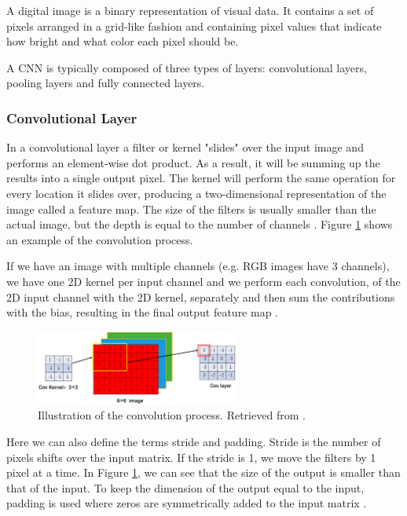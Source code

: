 A digital image is a binary representation of visual data. It contains a set of pixels arranged in a grid-like fashion and containing pixel values that indicate how bright and what color each pixel should be. 

A \ac{CNN} is typically composed of three types of layers: convolutional layers, pooling layers and fully connected layers. 

\subsubsection*{Convolutional Layer}

In a convolutional layer a filter or kernel "slides" over the input image and performs an element-wise dot product. As a result, it will be summing up the results into a single output pixel. The kernel will perform the same operation for every location it slides over, producing a two-dimensional representation of the image called a feature map. The size of the filters is usually smaller than the actual image, but the depth is equal to the number of channels \cite{2018guide}. Figure \ref{fig:convlayer} shows an example of the convolution process.

If we have an image with multiple channels (e.g. RGB images have 3 channels), we have one \ac{2D} kernel per input channel and we perform each convolution, of the \ac{2D} input channel with the \ac{2D} kernel, separately and then sum the contributions with the bias, resulting in the final output feature map \cite{2018guide}.

\begin{figure}[!htb]
  \centering
  \includegraphics[width=0.60\textwidth]{Images/convlayer.jpg}
  \caption[Illustration of the convolution process.]{Illustration of the convolution process. Retrieved from \cite{review:DL}.}
  \label{fig:convlayer}
\end{figure}

Here we can also define the terms stride and padding. Stride is the number of pixels shifts over the input matrix. If the stride is 1, we move the filters by 1 pixel at a time. In Figure \ref{fig:convlayer}, we can see that the size of the output is smaller than that of the input. To keep the dimension of the output equal to the input, padding is used where zeros are symmetrically added to the input matrix \cite{guide:cnn}.


